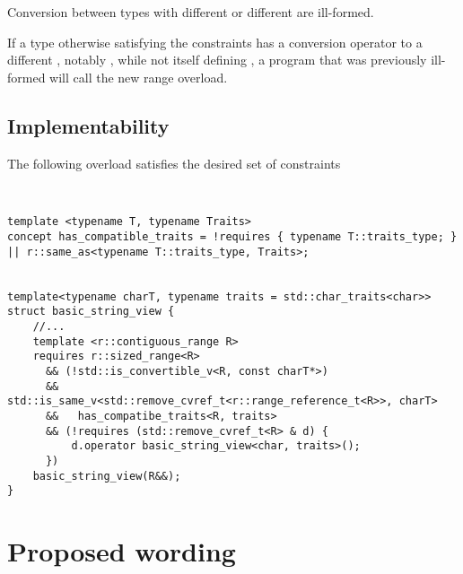 \documentclass{wg21}
\begin{document}
Conversion between  types with different  or different  are ill-formed.

If a type otherwise satisfying the constraints has a conversion operator to a different ,
notably , while not itself defining , a program that was previously ill-formed will call the new range overload. 


\subsection{Implementability}


The following overload satisfies the desired set of constraints

\begin{verbatim}


template <typename T, typename Traits>
concept has_compatible_traits = !requires { typename T::traits_type; } 
|| r::same_as<typename T::traits_type, Traits>;


template<typename charT, typename traits = std::char_traits<char>>
struct basic_string_view {
	//...
	template <r::contiguous_range R>
	requires r::sized_range<R>
	  && (!std::is_convertible_v<R, const charT*>) 
	  &&   std::is_same_v<std::remove_cvref_t<r::range_reference_t<R>>, charT>
	  &&   has_compatibe_traits<R, traits>
	  && (!requires (std::remove_cvref_t<R> & d) {
	      d.operator basic_string_view<char, traits>();
	  })
	basic_string_view(R&&);
}

\end{verbatim}


\section{Proposed wording}
\end{document}
